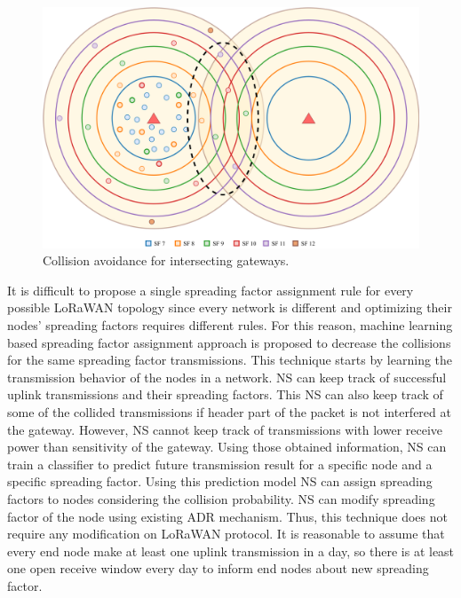 \begin{figure}
\centering
\includegraphics[width=\linewidth]{fig/lora_multi_gw_collision_fix.png}
\vspace*{4mm}
\caption{Collision avoidance for intersecting gateways.}
\label{fig:collision_solution_multi_gw}
\end{figure}

It is difficult to propose a single spreading factor assignment rule for every possible LoRaWAN topology since every network is different and optimizing their nodes' spreading factors requires different rules. For this reason, machine learning based spreading factor assignment approach is proposed to decrease the collisions for the same spreading factor transmissions. This technique starts by learning the transmission behavior of the nodes in a network. NS can keep track of successful uplink transmissions and their spreading factors. This NS can also keep track of some of the collided transmissions if header part of the packet is not interfered at the gateway. However, NS cannot keep track of transmissions with lower receive power than sensitivity of the gateway. Using those obtained information, NS can train a classifier to predict future transmission result for a specific node and a specific spreading factor. Using this prediction model NS can assign spreading factors to nodes considering the collision probability. NS can modify spreading factor of the node using existing ADR mechanism. Thus, this technique does not require any modification on LoRaWAN protocol. It is reasonable to assume that every end node make at least one uplink transmission in a day, so there is at least one open receive window every day to inform end nodes about new spreading factor.

